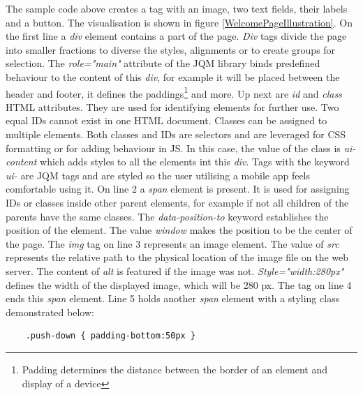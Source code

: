 The sample code above creates a tag with an image, two text fields, their labels and a button. The visualisation is shown in figure \ref{WelcomePageIllustration}. On the first line a \textit{div} element contains a part of the page. \textit{Div} tags divide the page into smaller fractions to diverse the styles, alignments or to create groups for selection. The \textit{role="main"} attribute of the JQM library binds predefined behaviour to the content of this \textit{div}, for example it will be placed between the header and footer, it defines the paddings\footnote{Padding determines the distance between the border of an element and display of a device} and more. Up next are \textit{id} and \textit{class} HTML attributes. They are used for identifying elements for further use. Two equal IDs cannot exist in one HTML document. Classes can be assigned to multiple elements. Both classes and IDs are selectors and are leveraged for CSS formatting or for adding behaviour in JS. In this case, the value of the class is \textit{ui-content} which adds styles to all the elements int this \textit{div}. Tags with the keyword \textit{ui-} are JQM tags and are styled so the user utilising a mobile app feels comfortable using it. On line 2 a \textit{span} element is present. It is used for assigning IDs or classes inside other parent elements, for example if not all children of the parents have the same classes. The \textit{data-position-to} keyword establishes the position of the element. The value \textit{window} makes the position to be the center of the page. The \textit{img} tag on line 3 represents an image element. The value of \textit{src} represents the relative path to the physical location of the image file on the web server. The content of \textit{alt} is featured if the image was not. \textit{Style="width:280px"} defines the width of the displayed image, which will be 280 px. The tag on line 4 ends this \textit{span} element. Line 5 holds another \textit{span} element with a styling class demonstrated below:
\lstset{style=sharpc, numbers=none}
\begin{lstlisting}
	.push-down { padding-bottom:50px }
\end{lstlisting}
